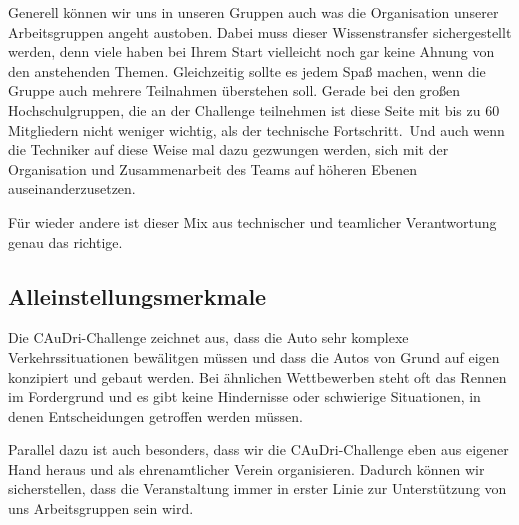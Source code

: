 Generell können wir uns in unseren Gruppen auch was die Organisation unserer
Arbeitsgruppen angeht austoben. Dabei muss dieser Wissenstransfer sichergestellt werden,
denn viele haben bei Ihrem Start vielleicht noch gar keine
Ahnung von den anstehenden Themen. Gleichzeitig sollte es jedem Spaß machen,
wenn die Gruppe auch mehrere Teilnahmen überstehen soll. 
Gerade bei den großen Hochschulgruppen, die an der Challenge teilnehmen ist diese
Seite mit bis zu 60 Mitgliedern nicht weniger wichtig, als der technische Fortschritt.\
Und auch wenn die Techniker auf diese Weise mal dazu gezwungen werden, sich
mit der Organisation und Zusammenarbeit des Teams auf höheren Ebenen auseinanderzusetzen.

Für wieder andere ist dieser Mix aus technischer und teamlicher Verantwortung
genau das richtige.

\subsection{Alleinstellungsmerkmale}
Die CAuDri-Challenge zeichnet aus, dass die Auto sehr komplexe Verkehrssituationen
bewälitgen müssen und dass die Autos von Grund auf eigen konzipiert und gebaut werden.
Bei ähnlichen Wettbewerben steht oft das Rennen im Fordergrund und es gibt keine Hindernisse
oder schwierige Situationen, in denen Entscheidungen getroffen werden müssen.

Parallel dazu ist auch besonders, dass wir die CAuDri-Challenge eben aus eigener
Hand heraus und als ehrenamtlicher Verein organisieren. Dadurch können wir sicherstellen,
dass die Veranstaltung immer in erster Linie zur Unterstützung von uns Arbeitsgruppen
 sein wird.
